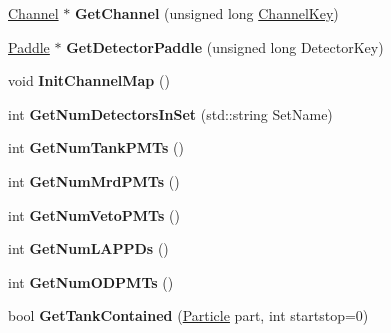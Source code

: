 \begin{DoxyCompactItemize}
\item 
\hypertarget{classGeometry_a68873d502689bb73337c3f8d6e0ef3bf}{
\hyperlink{classChannel}{Channel} $\ast$ {\bfseries GetChannel} (unsigned long \hyperlink{classChannelKey}{ChannelKey})}
\label{classGeometry_a68873d502689bb73337c3f8d6e0ef3bf}

\item 
\hypertarget{classGeometry_a95975e11106a9f788eff29514e0af2cb}{
\hyperlink{classPaddle}{Paddle} $\ast$ {\bfseries GetDetectorPaddle} (unsigned long DetectorKey)}
\label{classGeometry_a95975e11106a9f788eff29514e0af2cb}

\item 
\hypertarget{classGeometry_a60e84520417769401492de9e182636fc}{
void {\bfseries InitChannelMap} ()}
\label{classGeometry_a60e84520417769401492de9e182636fc}

\item 
\hypertarget{classGeometry_a4354935089665d2856b9a9a5bb1f181a}{
int {\bfseries GetNumDetectorsInSet} (std::string SetName)}
\label{classGeometry_a4354935089665d2856b9a9a5bb1f181a}

\item 
\hypertarget{classGeometry_a5dd283584b56f19637b114198c810b7d}{
int {\bfseries GetNumTankPMTs} ()}
\label{classGeometry_a5dd283584b56f19637b114198c810b7d}

\item 
\hypertarget{classGeometry_adc4f55d81e288f3d9c1c9fdf4a8848fe}{
int {\bfseries GetNumMrdPMTs} ()}
\label{classGeometry_adc4f55d81e288f3d9c1c9fdf4a8848fe}

\item 
\hypertarget{classGeometry_a5b927dcf27fd80c85764ae046836fd8c}{
int {\bfseries GetNumVetoPMTs} ()}
\label{classGeometry_a5b927dcf27fd80c85764ae046836fd8c}

\item 
\hypertarget{classGeometry_a7dbd2d763bd5944732aeb26430ded65b}{
int {\bfseries GetNumLAPPDs} ()}
\label{classGeometry_a7dbd2d763bd5944732aeb26430ded65b}

\item 
\hypertarget{classGeometry_aa53bb4913ece4beff2e7bda1070c19a1}{
int {\bfseries GetNumODPMTs} ()}
\label{classGeometry_aa53bb4913ece4beff2e7bda1070c19a1}

\item 
\hypertarget{classGeometry_aca1dd1c2919c14b2d8bdf40db23c5ba9}{
bool {\bfseries GetTankContained} (\hyperlink{classParticle}{Particle} part, int startstop=0)}
\label{classGeometry_aca1dd1c2919c14b2d8bdf40db23c5ba9}


\end{DoxyCompactItemize}
